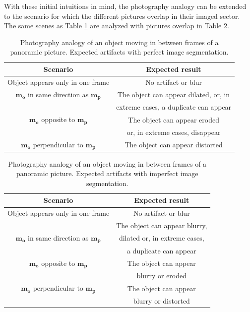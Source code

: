 With these initial intuitions in mind, the photography analogy can be extended to the scenario for which the different pictures overlap in their imaged sector. The same scenes as Table \ref{table:panoramic_perfect} are analyzed with pictures overlap in Table \ref{table:panoramic_imperfect}.

\begin{table}[!ht]
\centering
\begin{tabular}{| c | c |}
  \hline
  \textbf{Scenario}  &   \textbf{Expected result} \\
  \hline
  Object appears only in one frame    &   No artifact or blur \\
  \hline
  $\boldsymbol{m_o}$ in same direction as $\boldsymbol{m_p}$  &  The object can appear dilated, or, in \\
    &  extreme cases, a duplicate can appear \\
  \hline
  $\boldsymbol{m_o}$ opposite to $\boldsymbol{m_p}$    &  The object can appear eroded   \\
    &   or, in extreme cases, disappear \\
  \hline
  $\boldsymbol{m_o}$ perpendicular to $\boldsymbol{m_p}$    &   The object can appear distorted \\
  \hline
 \end{tabular}
\caption{Photography analogy of an object moving in between frames of a panoramic picture. Expected artifacts with perfect image segmentation.}
\label{table:panoramic_perfect}
\end{table}


\begin{table}[!ht]
\centering
\begin{tabular}{| c | c |}
  \hline
  \textbf{Scenario}  &   \textbf{Expected result} \\
  \hline
  Object appears only in one frame    &   No artifact or blur \\
  \hline
    &  The object can appear blurry, \\
  $\boldsymbol{m_o}$ in same direction as $\boldsymbol{m_p}$  &   dilated or, in extreme cases,  \\
    &   a duplicate can appear   \\
  \hline
  $\boldsymbol{m_o}$ opposite to $\boldsymbol{m_p}$    &  The object can appear \\
    &   blurry or eroded  \\
  \hline
  $\boldsymbol{m_o}$ perpendicular to $\boldsymbol{m_p}$    &   The object can appear \\
    &   blurry or distorted \\
  \hline
 \end{tabular}
\caption{Photography analogy of an object moving in between frames of a panoramic picture. Expected artifacts with imperfect image segmentation.}
\label{table:panoramic_imperfect}
\end{table}

